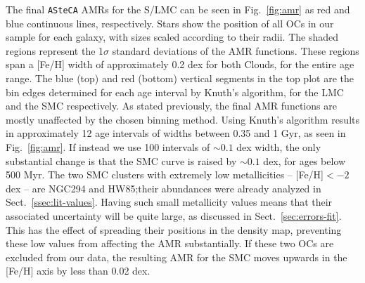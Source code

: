 \documentclass{aa}
\begin{document}
The final \texttt{ASteCA} AMRs for the S/LMC can be seen in Fig.~\ref{fig:amr}
as red and blue continuous lines, respectively. Stars show the position of all
OCs in our sample for each galaxy, with sizes scaled according to their radii.
%
The shaded regions represent the 1$\sigma$ standard deviations of the AMR
functions. These regions span a [Fe/H] width of approximately 0.2 dex for both
Clouds, for the entire age range.
%
The blue (top) and red (bottom) vertical segments in the top plot are the bin
edges determined for each age interval by Knuth's algorithm, for the LMC and the
SMC respectively.
%
As stated previously, the final AMR functions are mostly unaffected by the
chosen binning method. Using Knuth's algorithm results in approximately 12 age
intervals of widths between 0.35 and 1 Gyr, as seen in Fig.~\ref{fig:amr}.
If instead we use 100 intervals of ${\sim}0.1$ dex width, the only substantial
change is that the SMC curve is raised by ${\sim}0.1$ dex, for ages below 500
Myr.
%
The two SMC clusters with extremely low metallicities -- [Fe/H]${<-}2$
dex -- are NGC294 and HW85;\@ their abundances were already analyzed in
Sect.~\ref{ssec:lit-values}.
Having such small metallicity values means that their associated uncertainty
will be quite large, as discussed in Sect.~\ref{sec:errors-fit}.
This has the effect of spreading their positions in the density
map, preventing these low values from affecting the AMR substantially.
If these two OCs are excluded from our data, the resulting AMR for the SMC moves
upwards in the [Fe/H] axis by less than 0.02 dex.
\end{document}
